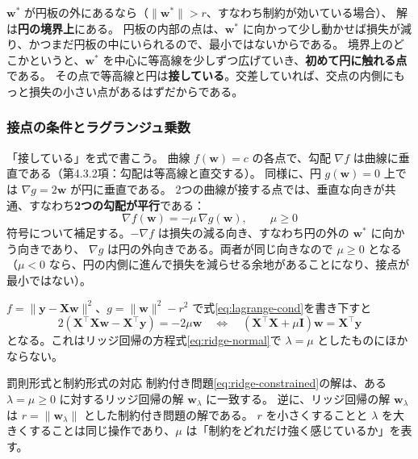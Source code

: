 $\bm{w}^*$ が円板の外にあるなら（$\|\bm{w}^*\| > r$、すなわち制約が効いている場合）、
解は\textbf{円の境界上}にある。
円板の内部の点は、$\bm{w}^*$ に向かって少し動かせば損失が減り、かつまだ円板の中にいられるので、最小ではないからである。
境界上のどこかというと、$\bm{w}^*$ を中心に等高線を少しずつ広げていき、\textbf{初めて円に触れる点}である。
その点で等高線と円は\textbf{接している}。交差していれば、交点の内側にもっと損失の小さい点があるはずだからである。

\subsubsection{接点の条件とラグランジュ乗数}

「接している」を式で書こう。
曲線 $f(\bm{w}) = c$ の各点で、勾配 $\nabla f$ は曲線に垂直である（第4.3.2項：勾配は等高線と直交する）。
同様に、円 $g(\bm{w}) = 0$ 上では $\nabla g = 2\bm{w}$ が円に垂直である。
2つの曲線が接する点では、垂直な向きが共通、すなわち\textbf{2つの勾配が平行}である：
\begin{equation}
  \nabla f(\bm{w}) = -\mu\,\nabla g(\bm{w}), \qquad \mu \geq 0
  \label{eq:lagrange-cond}
\end{equation}
符号について補足する。$-\nabla f$ は損失の減る向き、すなわち円の外の $\bm{w}^*$ に向かう向きであり、
$\nabla g$ は円の外向きである。両者が同じ向きなので $\mu \geq 0$ となる
（$\mu < 0$ なら、円の内側に進んで損失を減らせる余地があることになり、接点が最小ではない）。

$f = \|\bm{y} - \bm{X}\bm{w}\|^2$、$g = \|\bm{w}\|^2 - r^2$ で式\eqref{eq:lagrange-cond}を書き下すと
\begin{equation*}
  2(\bm{X}^\top\bm{X}\bm{w} - \bm{X}^\top\bm{y}) = -2\mu\bm{w}
  \quad\Longleftrightarrow\quad
  (\bm{X}^\top\bm{X} + \mu\bm{I})\bm{w} = \bm{X}^\top\bm{y}
\end{equation*}
となる。これはリッジ回帰の方程式\eqref{eq:ridge-normal}で $\lambda = \mu$ としたものにほかならない。

\begin{itembox}[l]{罰則形式と制約形式の対応}
制約付き問題\eqref{eq:ridge-constrained}の解は、ある $\lambda = \mu \geq 0$ に対するリッジ回帰の解 $\bm{w}_\lambda$ に一致する。
逆に、リッジ回帰の解 $\bm{w}_\lambda$ は $r = \|\bm{w}_\lambda\|$ とした制約付き問題の解である。
$r$ を小さくすることと $\lambda$ を大きくすることは同じ操作であり、$\mu$ は「制約をどれだけ強く感じているか」を表す。
\end{itembox}

